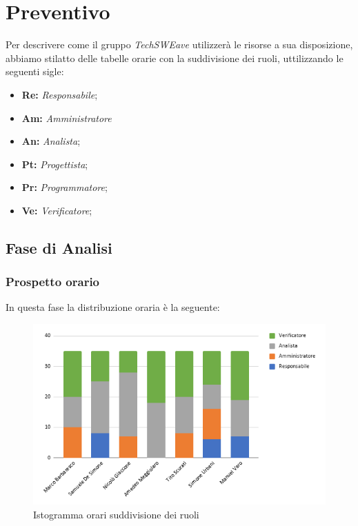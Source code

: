 \section{Preventivo}
Per descrivere come il gruppo \emph{TechSWEave} utilizzerà le risorse a sua disposizione, abbiamo stilatto delle tabelle orarie con la suddivisione dei ruoli, uttilizzando le seguenti sigle:
\begin{itemize}
    \item \textbf{Re: }\emph{Responsabile};
    \item \textbf{Am: }\emph{Amministratore}
    \item \textbf{An: }\emph{Analista};
    \item \textbf{Pt: }\emph{Progettista};
    \item \textbf{Pr: }\emph{Programmatore};
    \item \textbf{Ve: }\emph{Verificatore};
\end{itemize}

\subsection{Fase di Analisi}
    \subsubsection{Prospetto orario}
    In questa fase la distribuzione oraria è la seguente:
    \begin{figure}[!h]
            \caption{Istogramma orari suddivisione dei ruoli}
            \vspace{5px}
            \includegraphics[scale=0.6]{../../../Images/Diagrammi/Istogrammi/ore analisi.png}
            \centering
        \end{figure}
